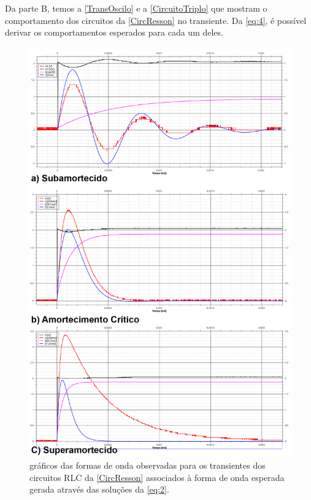 \documentclass[11pt,a4paper]{article}
\begin{document}
    
    Da parte B, temos a \cref{TransOscilo} e a \cref{CircuitoTriplo} que mostram o comportamento dos circuitos da \cref{CircResson} no transiente.
    Da \cref{eq:4}, é possível derivar os comportamentos esperados para cada um deles.
    
    
        \begin{figure}[!htb]
        \centering
        \includegraphics[scale=0.28]{Compara.png}
        \caption{gráficos das formas de onda observadas para os transientes dos circuitos RLC da \cref{CircResson} associados à forma de onda esperada gerada através das soluções da \cref{eq:2}.}
        \label{Compara}
        \end{figure}
    
\end{document}
